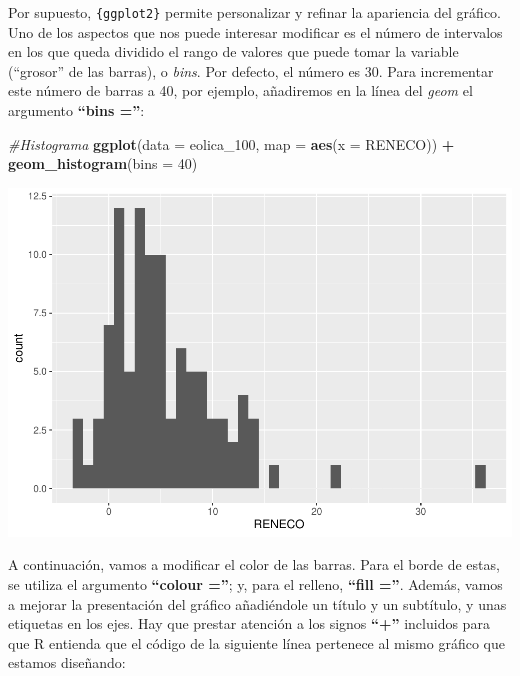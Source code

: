 \documentclass[
]{book}
\newenvironment{Shaded}{\begin{snugshade}}{\end{snugshade}}
\newcommand{\AttributeTok}[1]{\textcolor[rgb]{0.13,0.29,0.53}{#1}}
\newcommand{\CommentTok}[1]{\textcolor[rgb]{0.56,0.35,0.01}{\textit{#1}}}
\newcommand{\DecValTok}[1]{\textcolor[rgb]{0.00,0.00,0.81}{#1}}
\newcommand{\FunctionTok}[1]{\textcolor[rgb]{0.13,0.29,0.53}{\textbf{#1}}}
\newcommand{\NormalTok}[1]{#1}
\newcommand{\SpecialCharTok}[1]{\textcolor[rgb]{0.81,0.36,0.00}{\textbf{#1}}}
\let\Oldincludegraphics\includegraphics
\renewcommand{\includegraphics}[2][]{%
  \Oldincludegraphics[#1]{#2}%
}
\begin{document}
Por supuesto, \texttt{\{ggplot2\}} permite personalizar y refinar la apariencia del gráfico. Uno de los aspectos que nos puede interesar modificar es el número de intervalos en los que queda dividido el rango de valores que puede tomar la variable (``grosor'' de las barras), o \emph{bins}. Por defecto, el número es 30. Para incrementar este número de barras a 40, por ejemplo, añadiremos en la línea del \emph{geom} el argumento \textbf{``bins =''}:

\begin{Shaded}
\begin{Highlighting}[]
\CommentTok{\#Histograma}
\FunctionTok{ggplot}\NormalTok{(}\AttributeTok{data =}\NormalTok{ eolica\_100, }\AttributeTok{map =} \FunctionTok{aes}\NormalTok{(}\AttributeTok{x =}\NormalTok{ RENECO)) }\SpecialCharTok{+}
       \FunctionTok{geom\_histogram}\NormalTok{(}\AttributeTok{bins =} \DecValTok{40}\NormalTok{)}
\end{Highlighting}
\end{Shaded}

\includegraphics{_main_files/figure-latex/unnamed-chunk-108-1.pdf}

A continuación, vamos a modificar el color de las barras. Para el borde de estas, se utiliza el argumento \textbf{``colour =''}; y, para el relleno, \textbf{``fill =''}. Además, vamos a mejorar la presentación del gráfico añadiéndole un título y un subtítulo, y unas etiquetas en los ejes. Hay que prestar atención a los signos \textbf{``+''} incluidos para que R entienda que el código de la siguiente línea pertenece al mismo gráfico que estamos diseñando:
\end{document}
